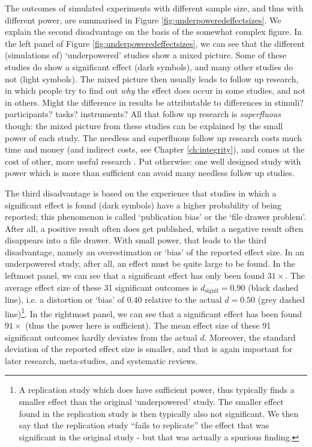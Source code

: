 \documentclass[
]{book}
\begin{document}
The outcomes of simulated experiments with different
sample size, and thus with different power, are summarised
in Figure \ref{fig:underpoweredeffectsizes}. We explain the second disadvantage on the basis of
the somewhat complex figure. In the left panel of Figure
\ref{fig:underpoweredeffectsizes}, we can see that the different
(simulations of) `underpowered' studies show a mixed
picture. Some of these studies do show a significant effect (dark symbols),
and many other studies do not (light symbols).
The mixed picture then usually leads to follow up research, in which
people try to find out \emph{why} the effect does occur in some studies,
and not in others. Might the difference in results be attributable
to differences in stimuli? participants? tasks?
instruments? All that follow up research is \emph{superfluous} though: the mixed
picture from these studies can be explained by the small
power of each study. The needless and superfluous follow up research
costs much time and money (and indirect costs,
see Chapter \ref{ch:integrity}), and comes at the cost of other, more useful
research \citep[p.118]{Schm96}. Put otherwise: one well designed study
with power which is more than sufficient can avoid many needless follow up studies.

The third disadvantage is based on the experience that studies in which
a significant effect is found (dark symbols) have a higher probability
of being reported; this phenomenon is called
`publication bias' or the `file drawer problem'. After all, a positive result
often does get published, whilst a negative result often disappears
into a file drawer. With small power, that leads to the third disadvantage,
namely an overestimation or `bias' of the reported effect size.
In an underpowered study, after all, an effect
must be quite large to be found. In the leftmost panel, we can see that
a significant effect has only been found \(31\times\). The average effect size of these
31 significant outcomes is \(\overline{d_{\textrm{signif}}}=0.90\) (black dashed line), i.e.
a distortion or `bias' of \(0.40\) relative to the actual
\(d=0.50\) (grey dashed line)\footnote{A replication study which does have sufficient power, thus typically finds a smaller effect than the
  original `underpowered' study. The smaller effect found in the replication study is then typically also not
  significant. We then say that the replication study ``fails to replicate'' the effect that was significant in
  the original study - but that was actually a spurious finding.}. In the rightmost panel, we can see that
a significant effect has been found \(91\times\) (thus the power here is sufficient).
The mean effect size of these 91 significant outcomes hardly deviates
from the actual \(d\). Moreover, the standard deviation of the reported
effect size is smaller, and that is again important for later research, meta-studies,
and systematic reviews.
\end{document}
